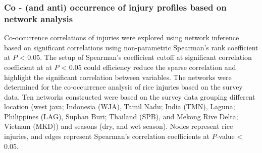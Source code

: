 

\subsubsection*{Co - (and anti) occurrence of injury profiles based on network analysis}

Co-occurrence correlations of injuries were explored using network inference based on significant correlations using non-parametric Spearman’s rank coefficient at $P$ < 0.05. The setup of Spearman's coefficient cutoff at significant correlation coefficient at at $P$ < 0.05 could efficiency reduce the sparse correlation and highlight the significant correlation between variables. The networks were determined for the co-occurrence analysis of rice injuries based on the survey data. Ten networks constructed were based on the survey data grouping different location (west java; Indonesia (WJA), Tamil Nadu; India (TMN), Laguna; Philippines (LAG), Suphan Buri; Thailand (SPB), and Mekong Rive Delta; Vietnam (MKD)) and seasons (dry, and wet season). Nodes represent rice injuries, and edges represent Spearman's correlation coefficients at $P$-value < 0.05. 

